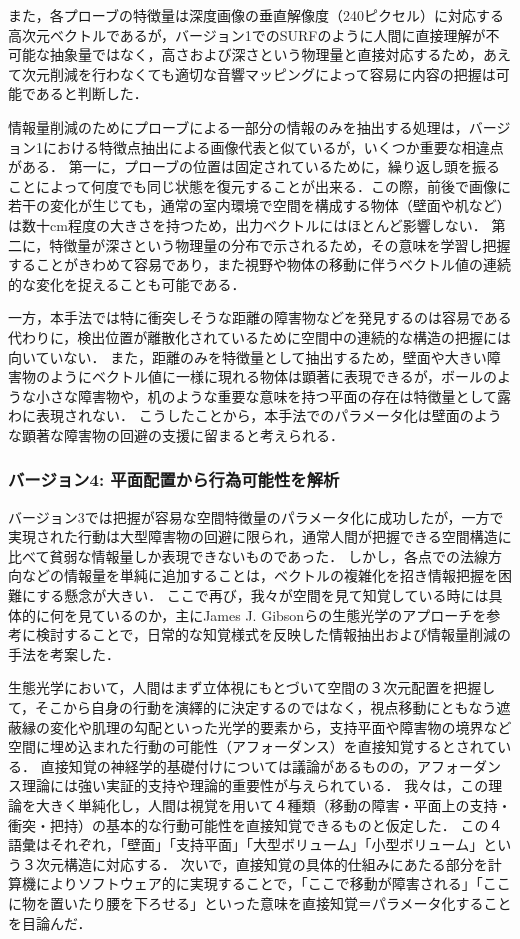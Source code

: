 また，各プローブの特徴量は深度画像の垂直解像度（240ピクセル）に対応する高次元ベクトルであるが，バージョン1でのSURFのように人間に直接理解が不可能な抽象量ではなく，高さおよび深さという物理量と直接対応するため，あえて次元削減を行わなくても適切な音響マッピングによって容易に内容の把握は可能であると判断した．

情報量削減のためにプローブによる一部分の情報のみを抽出する処理は，バージョン1における特徴点抽出による画像代表と似ているが，いくつか重要な相違点がある．
第一に，プローブの位置は固定されているために，繰り返し頭を振ることによって何度でも同じ状態を復元することが出来る．この際，前後で画像に若干の変化が生じても，通常の室内環境で空間を構成する物体（壁面や机など）は数十cm程度の大きさを持つため，出力ベクトルにはほとんど影響しない．
第二に，特徴量が深さという物理量の分布で示されるため，その意味を学習し把握することがきわめて容易であり，また視野や物体の移動に伴うベクトル値の連続的な変化を捉えることも可能である．

一方，本手法では特に衝突しそうな距離の障害物などを発見するのは容易である代わりに，検出位置が離散化されているために空間中の連続的な構造の把握には向いていない．
また，距離のみを特徴量として抽出するため，壁面や大きい障害物のようにベクトル値に一様に現れる物体は顕著に表現できるが，ボールのような小さな障害物や，机のような重要な意味を持つ平面の存在は特徴量として露わに表現されない．
こうしたことから，本手法でのパラメータ化は壁面のような顕著な障害物の回避の支援に留まると考えられる．


\subsubsection{バージョン4: 平面配置から行為可能性を解析}

バージョン3では把握が容易な空間特徴量のパラメータ化に成功したが，一方で実現された行動は大型障害物の回避に限られ，通常人間が把握できる空間構造に比べて貧弱な情報量しか表現できないものであった．
しかし，各点での法線方向などの情報量を単純に追加することは，ベクトルの複雑化を招き情報把握を困難にする懸念が大きい．
ここで再び，我々が空間を見て知覚している時には具体的に何を見ているのか，主にJames J. Gibsonらの生態光学のアプローチを参考に検討することで，日常的な知覚様式を反映した情報抽出および情報量削減の手法を考案した．

生態光学において，人間はまず立体視にもとづいて空間の３次元配置を把握して，そこから自身の行動を演繹的に決定するのではなく，視点移動にともなう遮蔽縁の変化や肌理の勾配といった光学的要素から，支持平面や障害物の境界など空間に埋め込まれた行動の可能性（アフォーダンス）を直接知覚するとされている．
直接知覚の神経学的基礎付けについては議論があるものの，アフォーダンス理論には強い実証的支持や理論的重要性が与えられている．
我々は，この理論を大きく単純化し，人間は視覚を用いて４種類（移動の障害・平面上の支持・衝突・把持）の基本的な行動可能性を直接知覚できるものと仮定した．
この４語彙はそれぞれ，「壁面」「支持平面」「大型ボリューム」「小型ボリューム」という３次元構造に対応する．
次いで，直接知覚の具体的仕組みにあたる部分を計算機によりソフトウェア的に実現することで，「ここで移動が障害される」「ここに物を置いたり腰を下ろせる」といった意味を直接知覚＝パラメータ化することを目論んだ．

